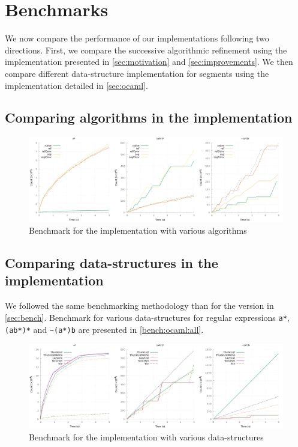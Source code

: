 \section{Benchmarks}
\label{sec:bench}

We now compare the performance of our implementations following two directions.
First, we compare the successive algorithmic refinement using the \haskell
implementation presented in \autoref{sec:motivation} and \autoref{sec:improvements}.
We then compare different data-structure implementation for segments
using the \ocaml implementation detailed in \autoref{sec:ocaml}.

\subsection{Comparing algorithms in the \haskell implementation}

\begin{figure}[h]
  \centering
  \includegraphics[width=\linewidth]{measure/haskell_all.png}
  \caption{Benchmark for the \haskell implementation with various algorithms}
  \label{bench:haskell:all}
\end{figure}

\subsection{Comparing data-structures in the \ocaml implementation}

We followed the same benchmarking methodology than for the \haskell
version in \autoref{sec:bench}. Benchmark for various data-structures
for regular expressions \verb/a*/, \verb/(ab*)*/ and \verb/~(a*)b/ are
presented in \autoref{bench:ocaml:all}.

\begin{figure}[h]
  \centering
  \includegraphics[width=\linewidth]{measure/ocaml_all.png}
  \caption{Benchmark for the \ocaml implementation with various data-structures}
  \label{bench:ocaml:all}
\end{figure}

